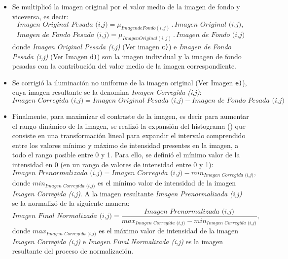 \begin{itemize}
\item Se multiplicó la imagen original por el valor medio de la imagen de fondo y viceversa, es decir:
\begin{equation*}
\textit{Imagen Original Pesada (i,j)} = \mu_{Imagen de Fondo (i,j)} \hspace{2pt} . \hspace{2pt} \textit{Imagen Original (i,j)},
\end{equation*}
\begin{equation*}
\textit{Imagen de Fondo Pesada (i,j)} = \mu_{Imagen Original (i,j) } \hspace{2pt} . \hspace{2pt} \textit{Imagen de Fondo (i,j)}
\end{equation*}
donde \textit{Imagen Original Pesada (i,j)} (Ver imagen \texttt{c)}) e \textit{Imagen de Fondo Pesada (i,j)} (Ver Imagen \texttt{d)}) son la imagen individual y la imagen de fondo pesadas con la contribución del valor medio de la imagen correspondiente.
\item Se corrigió la iluminación no uniforme de la imagen original (Ver Imagen \texttt{e)}), cuya imagen resultante se la denomina \textit{Imagen Corregida (i,j)}:
\begin{equation*}
\textit{Imagen Corregida (i,j)} = \textit{Imagen Original Pesada (i,j)} - \textit{Imagen de Fondo Pesada (i,j)}
\end{equation*}
\item Finalmente, para maximizar el contraste de la imagen, es decir para aumentar el rango dinámico de la imagen, se realizó la expansión del histograma (\cite{anilfund}) que consiste en una transformación lineal para expandir el intervalo comprendido entre los valores mínimo y máximo de intensidad presentes en la imagen, a todo el rango posible entre 0 y 1. Para ello, se definió el mínimo valor de la intensidad en 0 (en un rango de valores de intensidad entre 0 y 1):
\begin{equation*}
	\textit{Imagen Prenormalizada (i,j)} = \textit{Imagen Corregida (i,j)} - min_{\textit{Imagen Corregida (i,j)}},
\end{equation*}
donde $min_{\textit{Imagen Corregida (i,j)}}$ es el mínimo valor de intensidad de la imagen \textit{Imagen Corregida (i,j)}. A la imagen resultante \textit{Imagen Prenormalizada (i,j)} se la normalizó de la siguiente manera:
\begin{equation*}
	\textit{Imagen Final Normalizada (i,j)} = \frac{\textit{Imagen Prenormalizada (i,j)}}{max_{\textit{Imagen Corregida (i,j)}} -min_{\textit{Imagen Corregida (i,j)}}} ,
\end{equation*}
donde $max_{\textit{Imagen Corregida (i,j)}}$ es el máximo valor de intensidad de la imagen \textit{Imagen Corregida (i,j)} e \textit{Imagen Final Normalizada (i,j)} es la imagen resultante del proceso de normalización.
\end{itemize}

